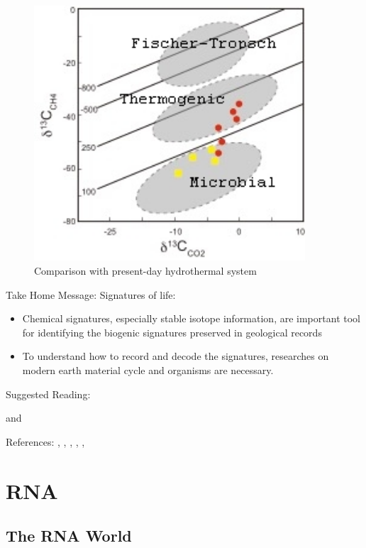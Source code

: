 \documentclass[]{article}
\begin{document}
\begin{figure}[H]
	\caption{Comparison with present-day hydrothermal system}\label{fig:ueno_comparison}
	\includegraphics[width=0.9\textwidth]{ueno_comparison}
\end{figure}

Take Home Message: Signatures of life:
\begin{itemize}
	\item Chemical signatures, especially stable isotope information, are important tool for identifying the biogenic signatures preserved in geological records
	\item To understand how to record and decode the signatures, researches on modern earth material cycle and organisms are 	necessary.
\end{itemize}

Suggested Reading:

\cite{sharp2017principles} and \cite{allegre2008isotope}

References:
\cite{ueno2006evidence},
 \cite{bell2015potentially}, \cite{rosing199913c},  \cite{shen2001isotopic}, \cite{summons19992}, \cite{han1992megascopic}

\section{RNA}

\subsection{The RNA World}
\end{document}
